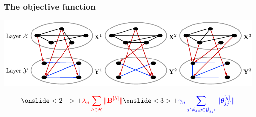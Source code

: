 \documentclass[10pt]{beamer}
\theoremstyle{definition}
\DeclareMathOperator*{\Tr}{Tr}
\DeclareMathOperator*{\argmin}{argmin}
\begin{document}
\begin{frame}
\frametitle{The objective function}

\begin{center}
\includegraphics[width=.9\textwidth]{multitwolayer}
\end{center}


$$
\onslide<2->{ + {\colr \lambda_n \sum_{h \in \cH} \| \bfB^{[h]} \|}}
\onslide<3>{ + {\colb \gamma_n \sum_{j' \neq j, g \in \cG_{jj'}} \| \bftheta_{jj'}^{[g]} \|}}
$$

\end{frame}
%
%
%
%
%
%
\end{document}
